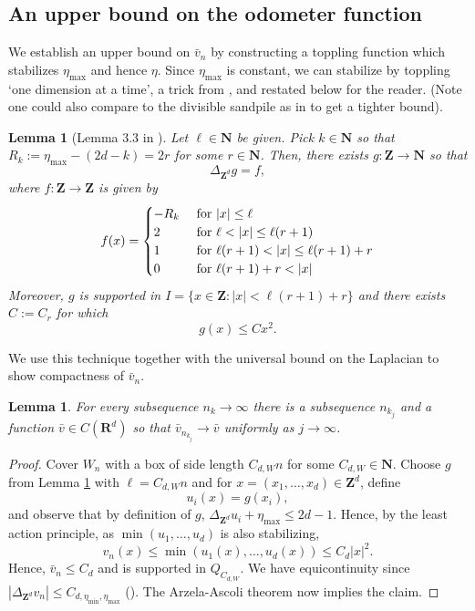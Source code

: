 \documentclass[12pt]{amsart}
\newcommand{\R}{\mathbf{R}}
\newcommand{\Z}{\mathbf{Z}}
\newcommand{\N}{\mathbf{N}}
\newtheorem{lemma}[theorem]{Lemma}
\begin{document}
\subsection{An upper bound on the odometer function} \label{subsec:compactness}
We establish an upper bound on $\bar{v}_n$ by constructing a toppling function 
which stabilizes $\eta_{\max}$ and hence $\eta$. Since $\eta_{\max}$ is constant, we can stabilize by toppling 
\lq one dimension at a time\rq, a trick from \cite{ fey2010growth}, and restated 
below for the reader. (Note one could also compare to the divisible sandpile as in \cite{levine2009strong} to get a tighter bound).
\begin{lemma}[Lemma 3.3 in \cite{ fey2010growth}] \label{lemma:one_dim}
	Let $\ell \in \N$ be given. Pick $k \in \N$ so that $R_k := \eta_{\max} - (2d-k) = 2 r $ for some $r \in \N$. Then, 
	there exists $g: \Z \to \N$ so that 
	\[
	\Delta_{\Z^d} g = f, 
	\]
	where  $f: \Z \to \Z$ is given by 
	\[
	f(x) = 
	\begin{cases} 
	-R_k &\mbox{ for $|x| \leq \ell$ }  \\
	2 &\mbox{ for $\ell < |x| \leq \ell(r + 1) $} \\
	1 &\mbox{ for $\ell(r+1)  <  |x| \leq \ell(r+1) + r$} \\
	0 &\mbox{ for $ \ell(r+1) + r< |x|$}
	\end{cases}
	\]
	Moreover, $g$ is supported in $I = \{ x \in \Z: |x| < \ell(r+1) + r\}$ and there exists $C:= C_{r}$ for which 
	\begin{equation} \label{quadratic bound}
	g(x) \leq C x^2. 
	\end{equation}
\end{lemma}
We use this technique together with the universal bound on the Laplacian to show compactness of $\bar{v}_n$. 
\begin{lemma}\label{compactness}
For every subsequence $n_k \to \infty$ there is a subsequence $n_{k_j}$
and a function $\bar{v} \in C(\R^d)$ so that $\bar{v}_{n_{k_j}} \to \bar{v}$
uniformly as $j \to \infty$. 
\end{lemma}

\begin{proof}

Cover $W_n$ with a box of side length $C_{d, W} n$ for some $C_{d, W} \in \N$. Choose $g$ from Lemma \ref{lemma:one_dim} with $\ell = C_{d, W} n$ and 
for $x = (x_1, \ldots, x_d) \in \Z^d$, define 
\[
u_i(x) = g(x_i), 
\]
and observe that by definition of $g$, $\Delta_{\Z^d} u_i+ \eta_{\max} \leq 2 d -1$.  Hence, by the least action principle, as $\min(u_1, \ldots, u_d)$ is also stabilizing, 
\[
v_n(x) \leq \min(u_1(x), \ldots, u_d(x)) \leq C_d |x|^2.
\]
Hence, $\bar{v}_n \leq C_d$ and is supported in $Q_{C_{d,W}}$.  We have equicontinuity since $|\Delta_{\Z^d} v_n| \leq C_{d, \eta_{\min}, \eta_{\max}}$ (\cite{kuo2005estimates}). 
The Arzela-Ascoli theorem now implies the claim. 
\end{proof} 
\end{document}
